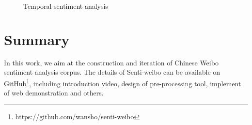 \documentclass[runningheads]{llncs}
\begin{document}
\begin{figure}[ht]
\vspace{-0.5cm}  %
\centering  %
\caption{Temporal sentiment analysis}
\label{fig:sentiment-trend}
\end{figure}

\section{Summary}
 In this work, we aim at the construction and iteration of Chinese Weibo sentiment analysis corpus. The details of Senti-weibo can be available on GitHub\footnote{https://github.com/wansho/senti-weibo}, including introduction video, design of pre-processing tool, implement of web demonstration and others.
 


\end{document}
